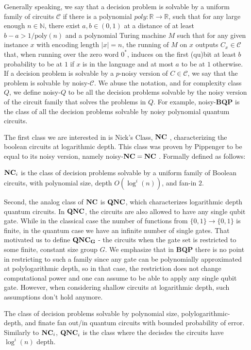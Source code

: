 \documentclass[manuscript,screen,review]{acmart}
\begin{document}
{  
  Generally speaking, we say that a decision problem is solvable by a uniform family of circuits $\mathcal{C}$ if there is a polynomial $poly : \mathbb{R} \rightarrow \mathbb{R}$, such that for any large enough $n \in \mathbb{N}$, there exist $a, b \in (0,1)$ at a distance of at least $b - a > 1/\text{poly}(n)$ and a polynomial Turing machine $M$ such that for any given instance $x$ with encoding length $|x| = n$, the running of $M$ on $x$ outputs $C_x \in \mathcal{C}$ that, when running over the zero word $0^{*}$, induces on the first (qu)bit at least $b$ probability to be at $1$ if $x$ is in the language and at most $a$ to be at $1$ otherwise. 
If a decision problem is solvable by a $p$-noisy version of $C \in \mathcal{C}$, we say that the problem is solvable by noisy-$\mathcal{C}$. We abuse the notation, and for complexity class $Q$, we define noisy-$Q$ to be all the decision problems solvable by the noisy version of the circuit family that solves the problems in $Q$. For example, noisy-\textbf{BQP} is the class of all the decision problems solvable by noisy polynomial quantum circuits.  


The first class we are interested in is Nick's Class, $\mathbf{NC}{}$ \cite{CITE}, characterizing the boolean circuits at logarithmic depth. This class was proven by Pippenger to be equal to its noisy version, namely noisy-$\mathbf{NC}{} = \mathbf{NC}{}$ \cite{Pippenger}. Formally defined as follows: 
\begin{definition}
$\mathbf{NC}_i$ is the class of decision problems solvable by a uniform family of Boolean circuits, with polynomial size, depth $O(\log^i(n))$, and fan-in $2$. 
\end{definition}


Second, the analog class of $\mathbf{NC}{}$ is $\QNC{}$, which characterizes logarithmic depth quantum circuits. In $\QNC{}$, the circuits are also allowed to have any single qubit gate. While in the classical case the number of functions from $\{0,1\} \rightarrow \{0,1\}$ is finite, in the quantum case we have an infinite number of single gates. That motivated us to define $\mathbf{QNC_G}{}$ - the circuits when the gate set is restricted to some finite, constant size group $G$. We emphasize that in \textbf{BQP} there is no point in restricting to such a family since any gate can be polynomially approximated at polylogarithmic depth, so in that case, the restriction does not change computational power and one can assume to be able to apply any single qubit gate. However, when considering shallow circuits at logarithmic depth, such assumptions don't hold anymore.
\begin{definition}[$\QNC{}$]
  The class of decision problems solvable by polynomial size,  polylogarithmic-depth,  and finate fan out/in quantum circuits with bounded probability of error. Similarly to $\mathbf{NC}_i{}$, $\mathbf{QNC}_i{}$ is the class where the decisdes the circuits have $\log^i (n)$ depth.  
\end{definition}

}
\end{document}
